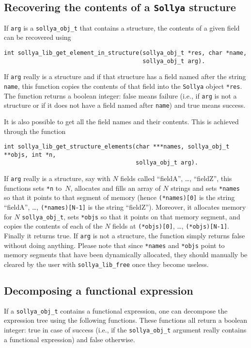 \documentclass[a4paper]{article}
\newcommand{\sollya}{\texttt{Sollya}\xspace}
\begin{document}
\subsection{Recovering the contents of a \sollya structure}
If \verb|arg| is a \verb|sollya_obj_t| that contains a structure, the contents of a given field can be recovered using
\begin{center}
\verb|int sollya_lib_get_element_in_structure(sollya_obj_t *res, char *name,|\\
\verb|                                        sollya_obj_t arg).             |
\end{center}
If \verb|arg| really is a structure and if that structure has a field named after the string \verb|name|, this function copies the contents of that field into the \sollya object \verb|*res|. The function returns a boolean integer: false means failure (i.e., if \verb|arg| is not a structure or if it does not have a field named after \verb|name|) and true means success.

It is also possible to get all the field names and their contents. This is achieved through the function
\begin{center}
\verb|int sollya_lib_get_structure_elements(char ***names, sollya_obj_t **objs, int *n,|\\
\verb|                                      sollya_obj_t arg).                          |
\end{center}
If \verb|arg| really is a structure, say with $N$ fields called ``fieldA'', \dots, ``fieldZ'', this functions sets \verb|*n| to~$N$, allocates and fills an array of $N$ strings and sets \verb|*names| so that it points to that segment of memory (hence \verb|(*names)[0]| is the string ``fieldA'', \dots, \verb|(*names)[N-1]| is the string ``fieldZ''). Moreover, it allocates memory for $N$ \verb|sollya_obj_t|, sets \verb|*objs| so that it points on that memory segment, and copies the contents of each of the $N$ fields at \verb|(*objs)[0]|, \dots, \verb|(*objs)[N-1]|. Finally it returns true. If \verb|arg| is not a structure, the function simply returns false without doing anything. Please note that since \verb|*names| and \verb|*objs| point to memory segments that have been dynamically allocated, they should manually be cleared by the user with \verb|sollya_lib_free| once they become useless.

\subsection{Decomposing a functional expression}
If a \texttt{sollya\_obj\_t} contains a functional expression, one can decompose the expression tree using the following functions. These functions all return a boolean integer: true in case of success (i.e., if the \texttt{sollya\_obj\_t} argument really contains a functional expression) and false otherwise.
\end{document}

